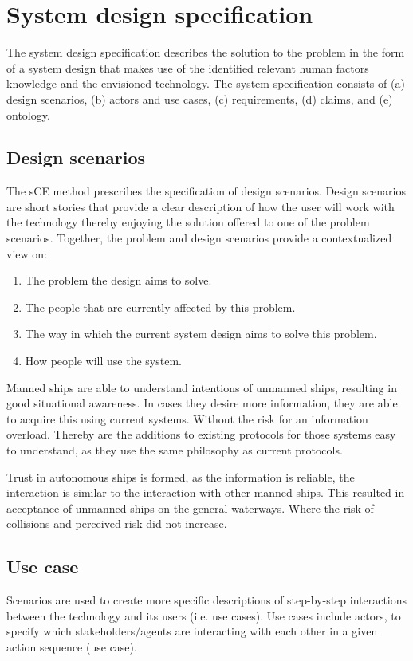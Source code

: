 \chapter{System design specification}
The system design specification describes the solution to the problem in the form of a system design that makes use of the identified relevant human factors knowledge and the envisioned technology. The system specification consists of (a) design scenarios, (b) actors and use cases, (c) requirements, (d) claims, and (e) ontology.

\section{Design scenarios}
The sCE method prescribes the specification of design scenarios. Design scenarios are short stories that provide a clear description of how the user will work with the technology thereby enjoying the solution offered to one of the problem scenarios. Together, the problem and design scenarios provide a contextualized view on:
\begin{enumerate}
	\item The problem the design aims to solve.
	\item The people that are currently affected by this problem.
	\item The way in which the current system design aims to solve this problem.
	\item How people will use the system.
\end{enumerate}

Manned ships are able to understand intentions of unmanned ships, resulting in good situational awareness. In cases they desire more information, they are able to acquire this using current systems. Without the risk for an information overload. Thereby are the additions to existing protocols for those systems easy to understand, as they use the same philosophy as current protocols.

Trust in autonomous ships is formed, as the information is reliable, the interaction is similar to the interaction with other manned ships. This resulted in acceptance of unmanned ships on the general waterways. Where the risk of collisions and perceived risk did not increase.

\section{Use case}
Scenarios are used to create more specific descriptions of step-by-step interactions between the technology and its users (i.e. use cases). Use cases include actors, to specify which stakeholders/agents are interacting with each other in a given action sequence (use case).

